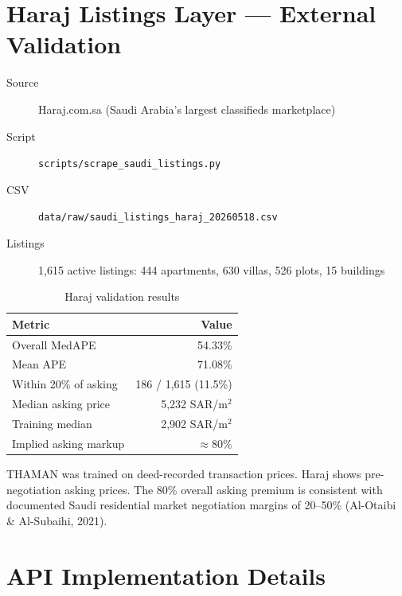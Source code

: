 \documentclass[11pt, a4paper, twoside]{report}
\begin{document}
\chapter{Haraj Listings Layer --- External Validation}
\label{ch:haraj}

\begin{description}
  \item[Source]    Haraj.com.sa (Saudi Arabia's largest classifieds marketplace)
  \item[Script]    \texttt{scripts/scrape\_saudi\_listings.py}
  \item[CSV]       \texttt{data/raw/saudi\_listings\_haraj\_20260518.csv}
  \item[Listings]  1,615 active listings: 444 apartments, 630 villas, 526 plots, 15 buildings
\end{description}

\begin{table}[H]
  \centering
  \caption{Haraj validation results}
  \begin{tabular}{lr}
    \toprule
    Metric & Value \\
    \midrule
    Overall MedAPE       & 54.33\% \\
    Mean APE             & 71.08\% \\
    Within 20\% of asking& 186 / 1,615 (11.5\%) \\
    Median asking price  & 5,232 SAR/m$^2$ \\
    Training median      & 2,902 SAR/m$^2$ \\
    Implied asking markup& $\approx 80\%$ \\
    \bottomrule
  \end{tabular}
\end{table}

THAMAN was trained on deed-recorded transaction prices. Haraj shows
pre-negotiation asking prices. The 80\% overall asking premium is consistent
with documented Saudi residential market negotiation margins of 20--50\%
(Al-Otaibi \& Al-Subaihi, 2021).

\chapter{API Implementation Details}
\label{ch:api}
\end{document}
